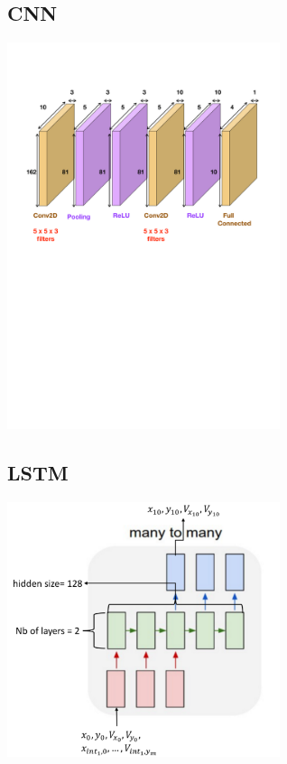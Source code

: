 \documentclass[a0,portrait]{a0poster}
\begin{document}
\begin{multicols}{2}
\begin{minipage}[]{0.5\linewidth}
\subsection*{CNN}
\centerline {\includegraphics[width=0.6\textwidth]{figure/CNN}}
\vspace{3cm}
\end{minipage}
\hfill
\begin{minipage}[]{0.5\linewidth}
\subsection*{LSTM}

\centerline {\includegraphics[width=0.6\textwidth]{figure/manytomany}}
\end{minipage}



\end{multicols}
\end{document}
